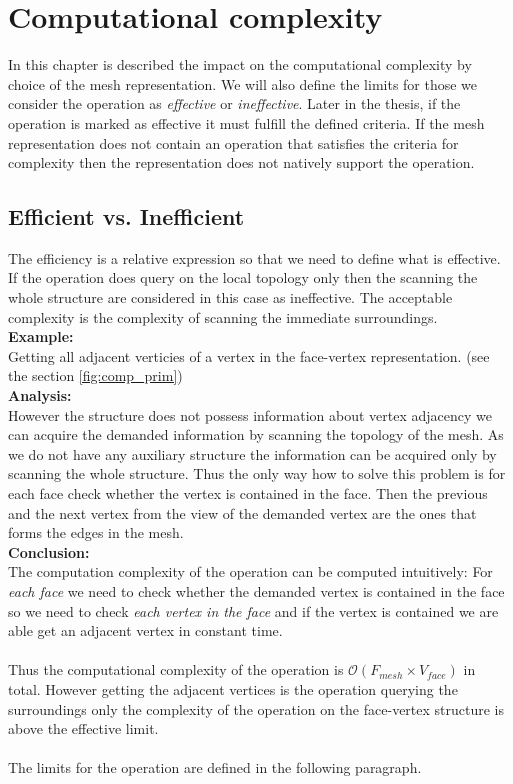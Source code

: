 \chapter{Computational complexity}

In this chapter is described the impact on the computational complexity by choice of the mesh
representation. We will also define the limits for those we consider the operation
as \emph{effective} or \emph{ineffective}. Later in the thesis, if the operation is
marked as effective it must fulfill the defined criteria. If the mesh representation
does not contain an operation that satisfies the criteria for complexity then
the representation does not natively support the operation.

\section{Efficient vs. Inefficient}
\label{sec:eff_vs_ineff}

The efficiency is a relative expression so that we need to define what is effective.
If the operation does query on the local topology only then the scanning the whole structure
are considered in this case as ineffective. The acceptable complexity is the complexity
of scanning the immediate surroundings.\\

\textbf{Example:}\\
Getting all adjacent verticies of a vertex in the face-vertex representation. (see
the section \ref{fig:comp_prim})\\

\textbf{Analysis:}\\
However the structure does not possess information about vertex adjacency
we can acquire the demanded information by scanning the topology of the mesh.
As we do not have any auxiliary structure the information can be acquired only by
scanning the whole structure. Thus the only way how to solve this problem
is for each face check whether the vertex is contained in the face. Then the
previous and the next vertex from the view of the demanded vertex are the ones
that forms the edges in the mesh.\\

\textbf{Conclusion:}\\
The computation complexity of the operation can be computed intuitively:
For \emph{each face} we need to check whether the demanded vertex is contained in the
face so we need to check \emph{each vertex in the face} and if the vertex is contained
we are able get an adjacent vertex in constant time.\\
\\
Thus the computational complexity of the operation
is $\mathcal{O}(F_{mesh} \times V_{face})$ in total.
However getting the adjacent vertices is the operation querying the surroundings only
the complexity of the operation on the face-vertex structure is above the effective limit.\\
\\
The limits for the operation are defined in the following paragraph.

